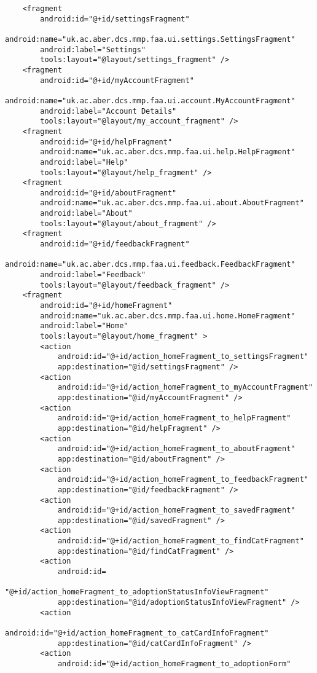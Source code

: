 \begin{verbatim}
    <fragment
        android:id="@+id/settingsFragment"
        android:name="uk.ac.aber.dcs.mmp.faa.ui.settings.SettingsFragment"
        android:label="Settings"
        tools:layout="@layout/settings_fragment" />
    <fragment
        android:id="@+id/myAccountFragment"
        android:name="uk.ac.aber.dcs.mmp.faa.ui.account.MyAccountFragment"
        android:label="Account Details"
        tools:layout="@layout/my_account_fragment" />
    <fragment
        android:id="@+id/helpFragment"
        android:name="uk.ac.aber.dcs.mmp.faa.ui.help.HelpFragment"
        android:label="Help"
        tools:layout="@layout/help_fragment" />
    <fragment
        android:id="@+id/aboutFragment"
        android:name="uk.ac.aber.dcs.mmp.faa.ui.about.AboutFragment"
        android:label="About"
        tools:layout="@layout/about_fragment" />
    <fragment
        android:id="@+id/feedbackFragment"
        android:name="uk.ac.aber.dcs.mmp.faa.ui.feedback.FeedbackFragment"
        android:label="Feedback"
        tools:layout="@layout/feedback_fragment" />
    <fragment
        android:id="@+id/homeFragment"
        android:name="uk.ac.aber.dcs.mmp.faa.ui.home.HomeFragment"
        android:label="Home"
        tools:layout="@layout/home_fragment" >
        <action
            android:id="@+id/action_homeFragment_to_settingsFragment"
            app:destination="@id/settingsFragment" />
        <action
            android:id="@+id/action_homeFragment_to_myAccountFragment"
            app:destination="@id/myAccountFragment" />
        <action
            android:id="@+id/action_homeFragment_to_helpFragment"
            app:destination="@id/helpFragment" />
        <action
            android:id="@+id/action_homeFragment_to_aboutFragment"
            app:destination="@id/aboutFragment" />
        <action
            android:id="@+id/action_homeFragment_to_feedbackFragment"
            app:destination="@id/feedbackFragment" />
        <action
            android:id="@+id/action_homeFragment_to_savedFragment"
            app:destination="@id/savedFragment" />
        <action
            android:id="@+id/action_homeFragment_to_findCatFragment"
            app:destination="@id/findCatFragment" />
        <action
            android:id=
            "@+id/action_homeFragment_to_adoptionStatusInfoViewFragment"
            app:destination="@id/adoptionStatusInfoViewFragment" />
        <action
            android:id="@+id/action_homeFragment_to_catCardInfoFragment"
            app:destination="@id/catCardInfoFragment" />
        <action
            android:id="@+id/action_homeFragment_to_adoptionForm"

\end{verbatim}
